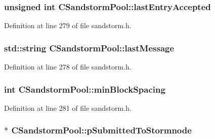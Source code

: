 \subsubsection[{last\+Entry\+Accepted}]{\setlength{\rightskip}{0pt plus 5cm}unsigned int C\+Sandstorm\+Pool\+::last\+Entry\+Accepted}\label{class_c_sandstorm_pool_affec253e6cc6927c89002d1c7ccc4cf0}


Definition at line 279 of file sandstorm.\+h.

\hypertarget{class_c_sandstorm_pool_ade4dc2454943976a421411d287b395c6}{}
\subsubsection[{last\+Message}]{\setlength{\rightskip}{0pt plus 5cm}std\+::string C\+Sandstorm\+Pool\+::last\+Message}\label{class_c_sandstorm_pool_ade4dc2454943976a421411d287b395c6}


Definition at line 278 of file sandstorm.\+h.

\hypertarget{class_c_sandstorm_pool_a955b0b4d31bd4160866d3205c6c3f023}{}
\subsubsection[{min\+Block\+Spacing}]{\setlength{\rightskip}{0pt plus 5cm}int C\+Sandstorm\+Pool\+::min\+Block\+Spacing}\label{class_c_sandstorm_pool_a955b0b4d31bd4160866d3205c6c3f023}


Definition at line 281 of file sandstorm.\+h.

\hypertarget{class_c_sandstorm_pool_a61589289244edd2ca3bc539d725d885c}{}
\subsubsection[{p\+Submitted\+To\+Stormnode}]{$\ast$ C\+Sandstorm\+Pool\+::p\+Submitted\+To\+Stormnode}\label{class_c_sandstorm_pool_a61589289244edd2ca3bc539d725d885c}



